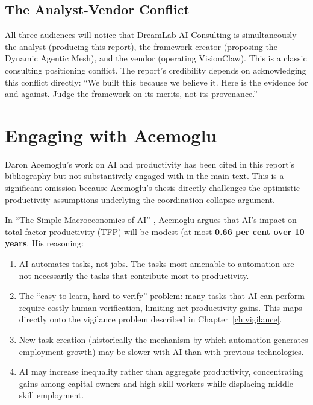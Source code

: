 \subsection{The Analyst-Vendor Conflict}

All three audiences will notice that DreamLab AI Consulting is simultaneously the analyst (producing this report), the framework creator (proposing the Dynamic Agentic Mesh), and the vendor (operating VisionClaw). This is a classic consulting positioning conflict. The report's credibility depends on acknowledging this conflict directly: ``We built this because we believe it. Here is the evidence for and against. Judge the framework on its merits, not its provenance.''

\section{Engaging with Acemoglu}

Daron Acemoglu's work on AI and productivity has been cited in this report's bibliography but not substantively engaged with in the main text. This is a significant omission because Acemoglu's thesis directly challenges the optimistic productivity assumptions underlying the coordination collapse argument.

\begin{evidencebox}[title={The Acemoglu Sceptical Thesis}]
In ``The Simple Macroeconomics of AI'' \parencite{Acemoglu2025}, Acemoglu argues that AI's impact on total factor productivity (TFP) will be modest (at most \textbf{0.66 per cent over 10 years}. His reasoning:

\begin{enumerate}
  \item AI automates tasks, not jobs. The tasks most amenable to automation are not necessarily the tasks that contribute most to productivity.
  \item The ``easy-to-learn, hard-to-verify'' problem: many tasks that AI can perform require costly human verification, limiting net productivity gains. This maps directly onto the vigilance problem described in Chapter~\ref{ch:vigilance}.
  \item New task creation (historically the mechanism by which automation generates employment growth) may be slower with AI than with previous technologies.
  \item AI may increase inequality rather than aggregate productivity, concentrating gains among capital owners and high-skill workers while displacing middle-skill employment.
\end{enumerate}
\end{evidencebox}

